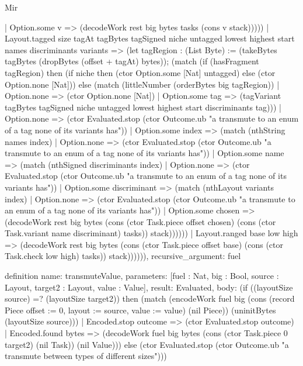\begin{lexlean}{Mir}
\begin{semanticmodule}
{              | Option.some v => (decodeWork rest big bytes tasks (cons v stack)))))
          | Layout.tagged size tagAt tagBytes tagSigned niche untagged lowest highest start names discriminants variants => (let tagRegion : (List Byte) := (takeBytes tagBytes (dropBytes (offset + tagAt) bytes)); (match (if (hasFragment tagRegion) then (if niche then (ctor Option.some [Nat] untagged) else (ctor Option.none [Nat])) else (match (littleNumber (orderBytes big tagRegion))
              | Option.none => (ctor Option.none [Nat])
              | Option.some tag => (tagVariant tagBytes tagSigned niche untagged lowest highest start discriminants tag)))
            | Option.none => (ctor Evaluated.stop (ctor Outcome.ub "a transmute to an enum of a tag none of its variants has"))
            | Option.some index => (match (nthString names index)
              | Option.none => (ctor Evaluated.stop (ctor Outcome.ub "a transmute to an enum of a tag none of its variants has"))
              | Option.some name => (match (nthSigned discriminants index)
                | Option.none => (ctor Evaluated.stop (ctor Outcome.ub "a transmute to an enum of a tag none of its variants has"))
                | Option.some discriminant => (match (nthLayout variants index)
                  | Option.none => (ctor Evaluated.stop (ctor Outcome.ub "a transmute to an enum of a tag none of its variants has"))
                  | Option.some chosen => (decodeWork rest big bytes (cons (ctor Task.piece offset chosen) (cons (ctor Task.variant name discriminant) tasks)) stack))))))
          | Layout.ranged base low high => (decodeWork rest big bytes (cons (ctor Task.piece offset base) (cons (ctor Task.check low high) tasks)) stack)))))),
  recursive_argument: fuel
}

definition{
  name: transmuteValue,
  parameters: [fuel : Nat, big : Bool, source : Layout, target2 : Layout, value : Value],
  result: Evaluated,
  body: (if ((layoutSize source) =? (layoutSize target2)) then (match (encodeWork fuel big (cons (record Piece {offset := 0, layout := source, value := value}) (nil Piece)) (uninitBytes (layoutSize source)))
    | Encoded.stop outcome => (ctor Evaluated.stop outcome)
    | Encoded.found bytes => (decodeWork fuel big bytes (cons (ctor Task.piece 0 target2) (nil Task)) (nil Value))) else (ctor Evaluated.stop (ctor Outcome.ub "a transmute between types of different sizes")))
}


\end{semanticmodule}
\end{lexlean}
